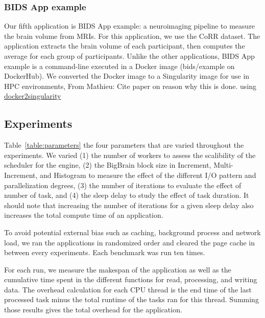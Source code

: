 \documentclass[conference]{IEEEtran}
\newcommand{\MD}[1]{\color{magenta}From Mathieu: #1 \color{black}}
\begin{document}
	
\subsubsection{BIDS App example}
Our fifth application is BIDS App example: a neuroimaging pipeline to measure the brain volume from MRIs.
For this application, we use the CoRR dataset.
The application extracts the brain volume of each participant, then computes the average for each group of participants.
Unlike the other applications, BIDS App example is a command-line executed in a Docker image (bids/example on DockerHub).
We converted the Docker image to a Singularity image for use in HPC environments, \MD{Cite paper on reason why this is done.}
using \href{https://hub.docker.com/r/singularityware/docker2singularity/tags/}{docker2singularity}

\subsection{Experiments}
Table~\ref{table:parameters} the four parameters that are varied throughout the experiments.
We varied (1) the number of workers to assess the scalibility of the scheduler for the engine,
(2) the BigBrain block size in Increment, Multi-Increment, and Histogram to measure the effect of the different I/O pattern and parallelization degrees,
(3) the number of iterations to evaluate the effect of number of task,
and (4) the sleep delay to study the effect of task duration.
It should note that increasing the number of iterations for a given sleep delay also increases the total compute time of an application.

To avoid potential external bias such as caching, background process and network load, we ran the applications in randomized order and cleared the page cache in between every experiments.
Each benchmark was run ten times.

For each run, we measure the makespan of the application as well as the cumulative time spent in the different functions for read, processing, and writing data.
The overhead calculation for each CPU thread is the end time of the last processed task minus the total runtime of the tasks ran for this thread.
Summing those results gives the total overhead for the application.
\end{document}
